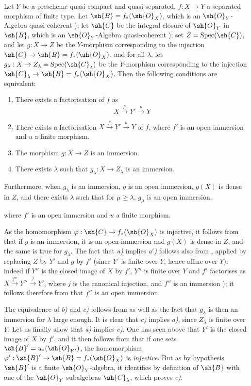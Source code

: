 \begin{proposition}[8.12.3]
\label{IV.8.12.3}
Let $Y$ be a prescheme quasi-compact and quasi-separated, $f:X\to Y$ a separated morphism of finite type.
Let $\sh{B}=f_*(\sh{O}_X)$, which is an $\sh{O}_Y$-Algebra quasi-coherent ); let $\sh{C}$ be the integral closure of $\sh{O}_Y$ in $\sh{B}$, which is an $\sh{O}_Y$-Algebra quasi-coherent ); set $Z=\operatorname{Spec}(\sh{C})$, and let $g:X\to Z$ be the $Y$-morphism corresponding to the injection $\sh{C}\to\sh{B}=f_*(\sh{O}_X)$, and for all $\lambda$, let $g_\lambda:X\to Z_\lambda=\operatorname{Spec}(\sh{C}_\lambda)$ be the $Y$-morphism corresponding to the injection $\sh{C}_\lambda\to\sh{B}=f_*(\sh{O}_X)$.
Then the following conditions are equivalent:
\begin{enumerate}[label=\emph{\alph*)}]
  \item There exists a factorisation of $f$ as
\[
X\xrightarrow{f'}Y'\xrightarrow{u}Y
\]
  \item[\rm a$'$)] There exists a factorisation $X\xrightarrow{f'}Y'\xrightarrow{u}Y$ of $f$, where $f'$ is an open immersion and $u$ a finite morphism.
  \item The morphism $g:X\to Z$ is an immersion.
  \item There exists $\lambda$ such that $g_\lambda:X\to Z_\lambda$ is an immersion.
\end{enumerate}
Furthermore, when $g_\lambda$ is an immersion, $g$ is an open immersion, $g(X)$ is dense in $Z$, and there exists $\lambda$ such that for $\mu\geqslant\lambda$, $g_\mu$ is an open immersion.
\end{proposition}

where $f'$ is an open immersion and $u$ a finite morphism.

As the homomorphism $\varphi:\sh{C}\to f_*(\sh{O}_X)$ is injective, it follows from  that if $g$ is an immersion, it is an open immersion and $g(X)$ is dense in $Z$, and the same is true for $g_\lambda$.
The fact that \emph{a)} implies \emph{a$'$)} follows also from , applied by replacing $Z$ by $Y'$ and $g$ by $f'$ (since $Y'$ is finite over $Y$, hence affine over $Y$): indeed if $Y''$ is the closed image of $X$ by $f'$, $Y''$ is finite over $Y$ and $f'$ factorises as $X\xrightarrow{f''}Y''\xrightarrow{j}Y'$, where $j$ is the canonical injection, and $f''$ is an immersion ); it follows therefore from  that $f''$ is an open immersion.

The equivalence of \emph{b)} and \emph{c)} follows from  as well as the fact that $g_\lambda$ is then an immersion for $\lambda$ large enough.
It is clear that \emph{c)} implies \emph{a)}, since $Z_\lambda$ is finite over $Y$.
Let us finally show that \emph{a)} implies \emph{c)}.
One has seen above that $Y'$ is the closed image of $X$ by $f'$, and it then follows from  that if one sets $\sh{B}'=u_*(\sh{O}_{Y'})$, the homomorphism $\varphi':\sh{B}'\to\sh{B}=f_*(\sh{O}_X)$ is \emph{injective}.
But as by hypothesis $\sh{B}'$ is a finite $\sh{O}_Y$-algebra, it identifies by definition of $\sh{B}$ with one of the $\sh{O}_Y$-subalgebras $\sh{C}_\lambda$, which proves \emph{c)}.

